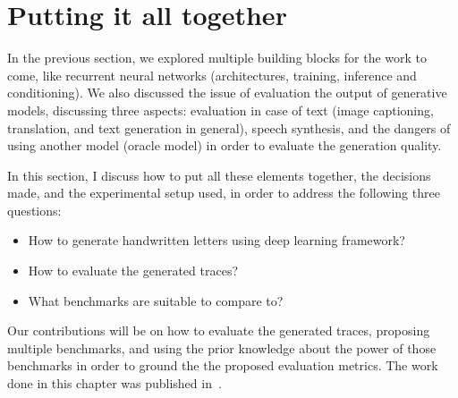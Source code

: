 

\section{Putting it all together}
\par In the previous section, we explored multiple building blocks for the work to come, like recurrent neural networks (architectures, training, inference and conditioning). We also discussed the issue of evaluation the output of generative models, discussing three aspects: evaluation in case of text (image captioning, translation, and text generation in general), speech synthesis, and the dangers of using another model (oracle model) in order to evaluate the generation quality.

\par In this section, I discuss how to put all these elements together, the decisions made, and the experimental setup used, in order to address the following three questions:
\begin{itemize}
    \item How to generate handwritten letters using deep learning framework?
    \item How to evaluate the generated traces?
    \item What benchmarks are suitable to compare to?
\end{itemize}

\par Our contributions will be on how to evaluate the generated traces, proposing multiple benchmarks, and using the prior knowledge about the power of those benchmarks in order to ground the the proposed evaluation metrics. The work done in this chapter was published in~\citep{mohammed2018handwriting}.


